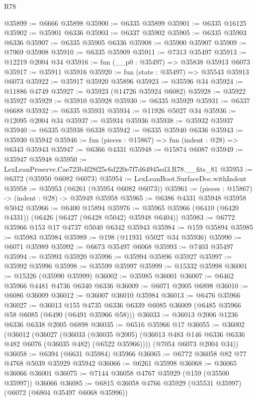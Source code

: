 \begin{lexlean}{R78}
\begin{coremodule}
@35899 := @6666 @35898
@35900 := @6335 @35899
@35901 := @6335 @16125
@35902 := @35901 @6336
@35903 := @6337 @35902
@35905 := @6335 @35903 @6336
@35907 := @6335 @35905 @6336
@35908 := @35900 @35907
@35909 := @7969 @35908
@35910 := @6335 @35909
@35911 := @7313 @35497
@35913 := @12219 @2004 @34
@35916 := fun (__p0 : @35497) => @35838 @35913 @6073
@35917 := @35911 @35916
@35920 := fun (state : @35497) => @35543 @35913 @6073
@35922 := @35917 @35920 @35896
@35923 := @35596 @34
@35924 := @11886 @4749
@35927 := @35923 (@14726 @35924 @6082)
@35928 := @35922 @35927
@35929 := @35910 @35928
@35930 := @6335 @35929
@35931 := @6337 @6688
@35932 := @6335 @35931
@35934 := @11926 @5027 @34
@35936 := @12095 @2004 @34
@35937 := @35934 @35936
@35938 := @35932 @35937
@35940 := @6335 @35938 @6338
@35942 := @6335 @35940 @6336
@35943 := @35930 @35942
@35946 := fun (pieces : @15867) => fun (indent : @28) => @6343 @35943
@35947 := @6366 @4331
@35948 := @15874 @6087
@35949 := @35947 @35948
@35950 := LexLeanPreserve.Cae723b4f28f25c6d220e7f7d64945ed3.R78.__fits_81
@35953 := @6372 (@35950 @6082 @6073)
@35954 := LexLeanBoot.SurfaceDoc.withIndent
@35958 := @35953 (@6261 (@35954 @6082 @6073))
@35961 := (pieces : @15867) -> (indent : @28) -> @35949 @35958
@35965 := @6386 @4331 @35948 @35958 @5042
@35966 := @6400 @15894
@35976 := @35965 @35966 (@6410 (@6420 @4331)) (@6426 (@6427 (@6428 @5042) @35948 @6404))
@35983 := @6772 @35966 @153 @17 @4737 @5040 @6342 @35943
@35984 := @159 @35894
@35985 := @35983 @35984
@35989 := @198 (@11931 @5027 @34 @35936)
@35990 := @6071 @35989
@35992 := @6673 @35497 @6068
@35993 := @7403 @35497
@35994 := @35993 @35920
@35996 := @35994 @35896 @35927
@35997 := @35992 @35996
@35998 := @35599 @35997
@35999 := @15332 @35998
@36001 := @15326 (@35990 @35999)
@36002 := @35985 @36001
@36007 := @6462 @35966 @4481 @4736 @6340 @6336
@36009 := @6071 @2005 @6898
@36010 := @6086 @36009
@36012 := @36007 @36010 @35984
@36013 := @6476 @35966
@36027 := @36013
    @155
    @4735
    @6336
    @6339
    @6085
    @36009
    (@6485 @35966 @58 @6085 (@6490 (@6491 @35966 @58)))
@36033 := @36013 @2006 @1236 @6336 @6338 @2005 @6898
@36035 := @6516 @35966 @17
@36055 := @36002
    (@36012
      (@36027
        (@36033
          (@36035 @2005)
          (@36013 @483 @146 @6336 @6336 @482 @6076 (@36035 @482) (@6522 @35966))))
      (@7054 @6073 @2004 @34))
@36058 := @6394 (@6631 @35984) @35966
@36065 := @6772 @36058 @82 @77 @4768 @5039 @35929 @35942
@36066 := @6261 @35998
@36068 := @36065 @36066 @36001
@36075 := @7144 @36058 @4767 @35929 (@159 (@35500 @35997)) @36066
@36085 := @6815 @36058 @4766 @35929 (@35531 @35997) (@6072 (@6804 @35497 @6068 @35996))

\end{coremodule}
\end{lexlean}
